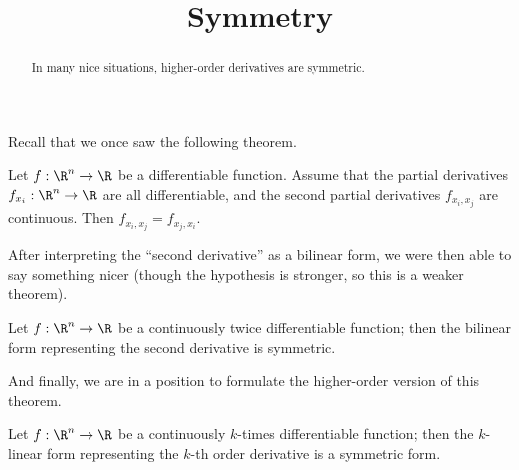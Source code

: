 \documentclass{ximera}
\title{Symmetry}
\begin{document}
\begin{abstract}
  In many nice situations, higher-order derivatives are symmetric.
\end{abstract}\maketitle

Recall that we once saw the following theorem.
\begin{theorem}
  Let $f:\R^n \to \R$ be a differentiable function.  Assume that the partial derivatives $f_{x_i}:\R^n \to \R$ are all differentiable, and the second partial derivatives
  $f_{x_i,x_j}$ are continuous.  Then $f_{x_i,x_j} = f_{x_j,x_i}$.
\end{theorem}
After interpreting the ``second derivative'' as a bilinear form, we
were then able to say something nicer (though the hypothesis is
stronger, so this is a weaker theorem).
\begin{theorem}
  Let $f:\R^n \to \R$ be a continuously twice differentiable function; then the bilinear form representing the second derivative is symmetric.
\end{theorem}

And finally, we are in a position to formulate the higher-order
version of this theorem.
\begin{theorem}
  Let $f:\R^n \to \R$ be a continuously $k$-times differentiable
  function; then the $k$-linear form representing the $k$-th order
  derivative is a symmetric form.
\end{theorem}
\end{document}
